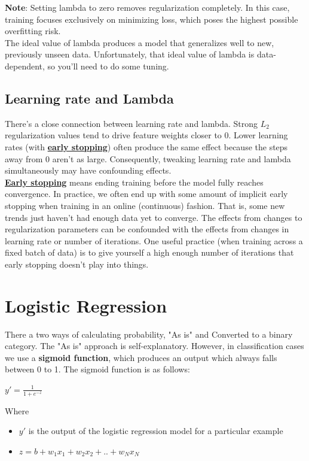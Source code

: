 \documentclass[12pt]{article}
\begin{document}
\textbf{Note}: Setting lambda to zero removes regularization completely. In this case, training focuses exclusively on minimizing loss, which poses the highest possible overfitting risk.
\\\newline The ideal value of lambda produces a model that generalizes well to new, previously unseen data. Unfortunately, that ideal value of lambda is data-dependent, so you'll need to do some tuning.
\subsection{Learning rate and Lambda}
There's a close connection between learning rate and lambda. Strong $L_2$ regularization values tend to drive feature weights closer to 0. Lower learning rates (with \href{https://developers.google.com/machine-learning/glossary#early_stopping}{\textbf{early stopping}}) often produce the same effect because the steps away from 0 aren't as large. Consequently, tweaking learning rate and lambda simultaneously may have confounding effects.
\\\newline \href{https://developers.google.com/machine-learning/glossary#early_stopping}{\textbf{Early stopping}} means ending training before the model fully reaches convergence. In practice, we often end up with some amount of implicit early stopping when training in an online (continuous) fashion. That is, some new trends just haven't had enough data yet to converge.
The effects from changes to regularization parameters can be confounded with the effects from changes in learning rate or number of iterations. One useful practice (when training across a fixed batch of data) is to give yourself a high enough number of iterations that early stopping doesn't play into things.
\section{Logistic Regression}
There a two ways of calculating probability, "As is" and Converted to a binary category. The "As is" approach is self-explanatory. However, in classification cases we use a \textbf{sigmoid function}, which produces an output which always falls between 0 to 1. The sigmoid function is as follows:
\begin{center}
\begin{LARGE}
$y' = \frac{1}{1 + e^{-z}}$
\end{LARGE}
\end{center}
Where 
\begin{itemize}
\item $y'$ is the output of the logistic regression model for a particular example
\item $z = b + w_1x_1 + w_2x_2 + .. + w_Nx_N$
\end{itemize}
\end{document}
